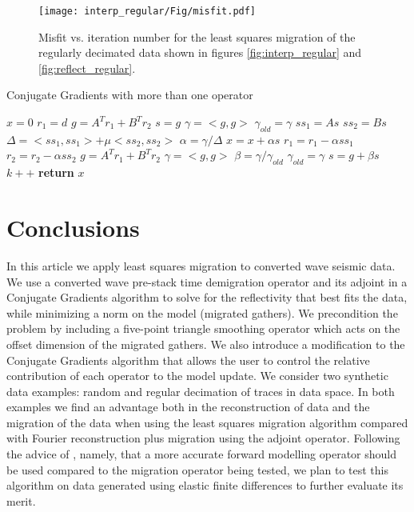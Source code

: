 \begin{figure}[h] %
	\centering
	\texttt{[image: interp\_regular/Fig/misfit.pdf]}
	\caption{Misfit vs. iteration number for the least squares migration of the regularly decimated data shown in figures \ref{fig:interp_regular} and \ref{fig:reflect_regular}.}
	\label{fig:misfit_regular}
\end{figure}


\begin{algorithm}
\small
\caption{Conjugate Gradients with more than one operator}\label{CG}
\begin{algorithmic}
   \State $x=0$ 
   \State $r_1=d$ 
   \State $g=A^Tr_1 + B^Tr_2$ 
   \State $s=g$ 
   \State $\gamma = <g,g>$
   \State $\gamma_{old} = \gamma$
      \State $ss_1 = As$
      \State $ss_2 = Bs$
      \State $\Delta = <ss_1,ss_1> + \mu<ss_2,ss_2>$
      \State $\alpha = \gamma / \Delta$
      \State $x = x + \alpha s$
      \State $r_1 = r_1 - \alpha ss_1$
      \State $r_2 = r_2 - \alpha ss_2$
      \State $g = A^Tr_1 + B^Tr_2$
      \State $\gamma = <g,g>$
      \State $\beta = \gamma/\gamma_{old}$
      \State $\gamma_{old} = \gamma$
      \State $s = g + \beta s$
      \State $k++$
   \EndWhile\label{euclidendwhile}
   \State \textbf{return} $x$
\EndProcedure
\end{algorithmic}
\end{algorithm}

\section{Conclusions}

In this article we apply least squares migration to converted wave seismic data. We use a converted wave pre-stack time demigration operator and its adjoint in a Conjugate Gradients algorithm to solve for the reflectivity that best fits the data, while minimizing a norm on the model (migrated gathers). We precondition the problem by including a five-point triangle smoothing operator which acts on the offset dimension of the migrated gathers. We also introduce a modification to the Conjugate Gradients algorithm that allows the user to control the relative contribution of each operator to the model update. We consider two synthetic data examples: random and regular decimation of traces in data space. In both examples we find an advantage both in the reconstruction of data and the migration of the data when using the least squares migration algorithm compared with Fourier reconstruction plus migration using the adjoint operator. Following the advice of \cite{Gray01seismicmigration}, namely, that a more accurate forward modelling operator should be used compared to the migration operator being tested, we plan to test this algorithm on data generated using elastic finite differences to further evaluate its merit.


